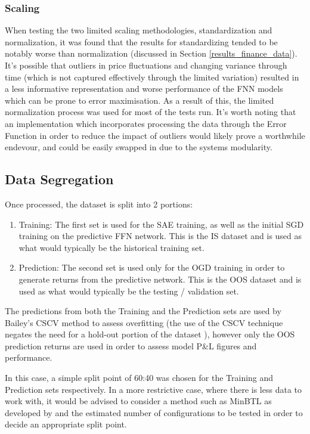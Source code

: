 \documentclass[a4paper,11pt,oneside]{article}
\theoremstyle{plain}
\theoremstyle{definition}
\begin{document}
	
	
	\subsubsection {Scaling} When testing the two limited scaling methodologies, standardization and normalization, it was found that the results for standardizing tended to be notably worse than normalization (discussed in Section \ref{results_finance_data}). It's possible that outliers in price fluctuations and changing variance through time (which is not captured effectively through the limited variation) resulted in a less informative representation and worse performance of the FNN models which can be prone to error maximisation. As a result of this, the limited normalization process was used for most of the tests run. It's worth noting that an implementation which incorporates processing the data through the Error Function in order to reduce the impact of outliers would likely prove a worthwhile endevour, and could be easily swapped in due to the systems modularity.\newline
	
	
	\subsection{Data Segregation}\label{proc_dataseg}
	
	Once processed, the dataset is split into 2 portions: 
	\begin{enumerate}
		\item Training: The first set is used for the SAE training, as well as the initial SGD training on the predictive FFN network. This is the IS dataset and is used as what would typically be the historical training set.
		\item Prediction: The second set is used only for the OGD training in order to generate returns from the predictive network. This is the OOS dataset and is used as what would typically be the testing / validation set.
	\end{enumerate}
	
	The predictions from both the Training and the Prediction sets are used by Bailey's CSCV method to assess overfitting (the use of the CSCV technique negates the need for a hold-out portion of the dataset \citep{BailyPBO}), however only the OOS prediction returns are used in order to assess model P\&L figures and performance. \newline
	
	In this case, a simple split point of 60:40 was chosen for the Training and Prediction sets respectively. In a more restrictive case, where there is less data to work with, it would be advised to consider a method such as MinBTL as developed by \citet{BaileyBTL} and the estimated number of configurations to be tested in order to decide an appropriate split point.
	
\end{document}
